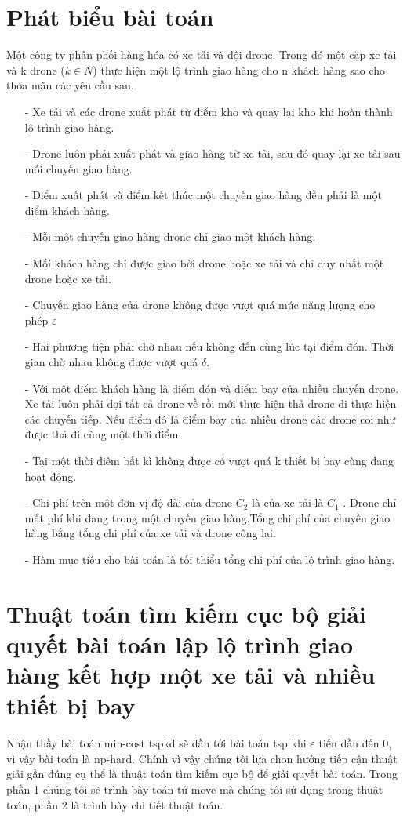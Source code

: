 \documentclass[a4paper,12pt]{report}
\begin{document}
\section{Phát biểu bài toán}
Một công ty phân phối hàng hóa có xe tải và đội drone. Trong đó một cặp xe tải và k drone ($k \in N$) thực hiện một lộ trình giao hàng cho n khách hàng sao cho thỏa mãn các yêu cầu sau.
\begin{itemize}
\item[-] Xe tải và các drone xuất phát từ điểm kho và quay lại kho khi hoàn thành lộ trình giao hàng.
\item[-] Drone luôn phải xuất phát và giao hàng từ xe tải, sau đó quay lại xe tải sau mỗi chuyến giao hàng.
\item[-] Điểm xuất phát và điểm kết thúc một chuyến giao hàng đều phải là một điểm khách hàng.
\item[-] Mỗi một chuyến giao hàng drone chỉ giao một khách hàng.
\item[-] Mối khách hàng chỉ được giao bời drone hoặc xe tải và chỉ duy nhất một drone hoặc xe tải.
\item[-] Chuyến giao hàng của drone không được vượt quá mức năng lượng cho phép $\varepsilon$ 
\item[-] Hai phương tiện phải chờ nhau nếu không đến cùng lúc tại điểm đón. Thời gian chờ nhau không được vượt quá $\delta$.
\item[-] Với một điểm khách hàng là điểm đón và điểm bay của nhiều chuyến drone. Xe tải luôn phải đợi tất cả drone về rồi mới thực hiện thả drone đi thực hiện các chuyến tiếp. Nếu điểm đó là điểm bay của nhiều drone các drone coi như được thả đi cùng một thời điểm.
\item[-] Tại một thời điêm bất kì không được có vượt quá k thiết bị bay cùng đang hoạt động.
\item[-] Chi phí trên một đơn vị độ dài của drone $C_2$ là của xe tải là $C_1$ . Drone chỉ mất phí khi đang trong một chuyến giao hàng.Tổng chi phí của chuyền giao hàng bằng tổng chi phí của xe tải và drone công lại.
\item[-] Hàm mục tiêu cho bài toán là tối thiểu tổng chi phí của lộ trình giao hàng.
\end{itemize}
\section{Thuật toán tìm kiếm cục bộ giải quyết bài toán lập lộ trình giao hàng kết hợp một xe tải và nhiều thiết bị bay} 
Nhận thầy bài toán min-cost tspkd sẽ dần tới bài toán tsp khi $\varepsilon$ tiến dần đến 0, vì vậy bài toán là np-hard. Chính vì vậy chúng tôi lựa chon hướng tiếp cận thuật giải gần đúng cụ thể là thuật toán tìm kiếm cục bộ để giải quyết bài toán. Trong phần 1 chúng tôi sẽ trình bày toán tử move mà chúng tôi sử dụng trong thuật toán, phần 2 là trình bày chi tiết thuật toán.
\end{document}
